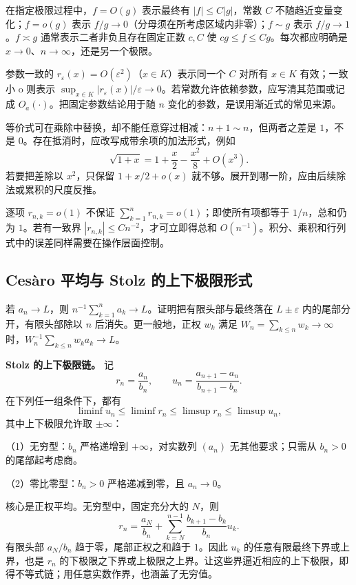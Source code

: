 \documentclass[UTF8,12pt,a4paper,fontset=fandol]{ctexart}
\begin{document}
\label{app:limit-notation}

在指定极限过程中，$f=O(g)$ 表示最终有 $|f|\leq C|g|$，常数 $C$ 不随趋近变量变化；$f=o(g)$ 表示 $f/g\to0$（分母须在所考虑区域内非零）；$f\sim g$ 表示 $f/g\to1$。$f\asymp g$ 通常表示二者非负且存在固定正数 $c,C$ 使 $cg\leq f\leq Cg$。每次都应明确是 $x\to0$、$n\to\infty$，还是另一个极限。

参数一致的 $r_\varepsilon(x)=O(\varepsilon^2)$（$x\in K$）表示同一个 $C$ 对所有 $x\in K$ 有效；一致小 o 则表示 $\sup_{x\in K}|r_\varepsilon(x)|/\varepsilon\to0$。若常数允许依赖参数，应写清其范围或记成 $O_a(\cdot)$。把固定参数结论用于随 $n$ 变化的参数，是误用渐近式的常见来源。

等价式可在乘除中替换，却不能任意穿过相减：$n+1\sim n$，但两者之差是 $1$，不是 $0$。存在抵消时，应改写成带余项的加法形式，例如
\[
\sqrt{1+x}=1+\frac x2-\frac{x^2}{8}+O(x^3).
\]
若要把差除以 $x^2$，只保留 $1+x/2+o(x)$ 就不够。展开到哪一阶，应由后续除法或累积的尺度反推。

逐项 $r_{n,k}=o(1)$ 不保证 $\sum_{k=1}^nr_{n,k}=o(1)$；即使所有项都等于 $1/n$，总和仍为 $1$。若有一致界 $|r_{n,k}|\leq Cn^{-2}$，才可立即得总和 $O(n^{-1})$。积分、乘积和行列式中的误差同样需要在操作层面控制。

\subsection{Cesàro 平均与 Stolz 的上下极限形式}

\label{app:limit-stolz}

若 $a_n\to L$，则 $n^{-1}\sum_{k=1}^na_k\to L$。证明把有限头部与最终落在 $L\pm\varepsilon$ 内的尾部分开，有限头部除以 $n$ 后消失。更一般地，正权 $w_k$ 满足 $W_n=\sum_{k\leq n}w_k\to\infty$ 时，$W_n^{-1}\sum_{k\leq n}w_ka_k\to L$。

\textbf{Stolz 的上下极限链。} 记
\[
r_n=\frac{a_n}{b_n},\qquad
u_n=\frac{a_{n+1}-a_n}{b_{n+1}-b_n}.
\]
在下列任一组条件下，都有
\[
\liminf u_n\leq\liminf r_n
\leq\limsup r_n\leq\limsup u_n,
\]
其中上下极限允许取 $\pm\infty$：

（1）无穷型：$b_n$ 严格递增到 $+\infty$，对实数列 $(a_n)$ 无其他要求；只需从 $b_n>0$ 的尾部起考虑商。

（2）零比零型：$b_n>0$ 严格递减到零，且 $a_n\to0$。

核心是正权平均。无穷型中，固定充分大的 $N$，则
\[
r_n=\frac{a_N}{b_n}
+\sum_{k=N}^{n-1}\frac{b_{k+1}-b_k}{b_n}u_k.
\]
有限头部 $a_N/b_n$ 趋于零，尾部正权之和趋于 $1$。因此 $u_k$ 的任意有限最终下界或上界，也是 $r_n$ 的下极限之下界或上极限之上界。让这些界逼近相应的上下极限，即得不等式链；用任意实数作界，也涵盖了无穷值。
\end{document}

